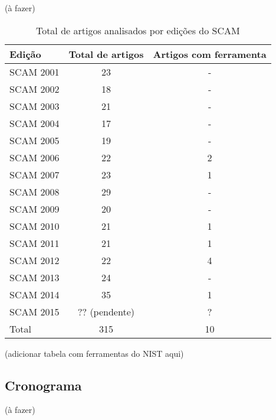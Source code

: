 \documentclass[12pt]{article}
\begin{document}
(à fazer)

\begin{table}
\caption{Total de artigos analisados por edições do SCAM}
\centering
\begin{tabular}{| l | c | c |}
\hline
Edição    & Total de artigos & Artigos com ferramenta \\
\hline
SCAM 2001 & 23               & -                      \\
SCAM 2002 & 18               & -                      \\
SCAM 2003 & 21               & -                      \\
SCAM 2004 & 17               & -                      \\
SCAM 2005 & 19               & -                      \\
SCAM 2006 & 22               & 2                      \\
SCAM 2007 & 23               & 1                      \\
SCAM 2008 & 29               & -                      \\
SCAM 2009 & 20               & -                      \\
SCAM 2010 & 21               & 1                      \\
SCAM 2011 & 21               & 1                      \\
SCAM 2012 & 22               & 4                      \\
SCAM 2013 & 24               & -                      \\
SCAM 2014 & 35               & 1                      \\
SCAM 2015 & ?? (pendente)    & ?                      \\
\hline
Total     & 315              & 10                     \\
\hline
\end{tabular}
\label{artigos-do-scam}
\end{table}

(adicionar tabela com ferramentas do NIST aqui)

\subsection{Cronograma}

(à fazer)


\end{document}
